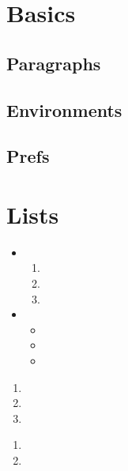 \documentclass[12pt,a4paper,oneside]{article}
\begin{document}
  \section{Basics}
    

    \subsection{Paragraphs}
      





    \subsection{Environments}

    \subsection{Prefs}

  \section{Lists}
    
    \begin{itemize}
      \item 
            \begin{enumerate}
              \item 
              \item 
              \item 
            \end{enumerate}
      \item 
            \begin{itemize}
              \item 
              \item 
              \item 
            \end{itemize}
    \end{itemize}


    \begin{enumerate}
      \item 
      \item 
      \item 
    \end{enumerate}

    \begin{enumerate}
      \item 
      \item 
    \end{enumerate}
\end{document}
